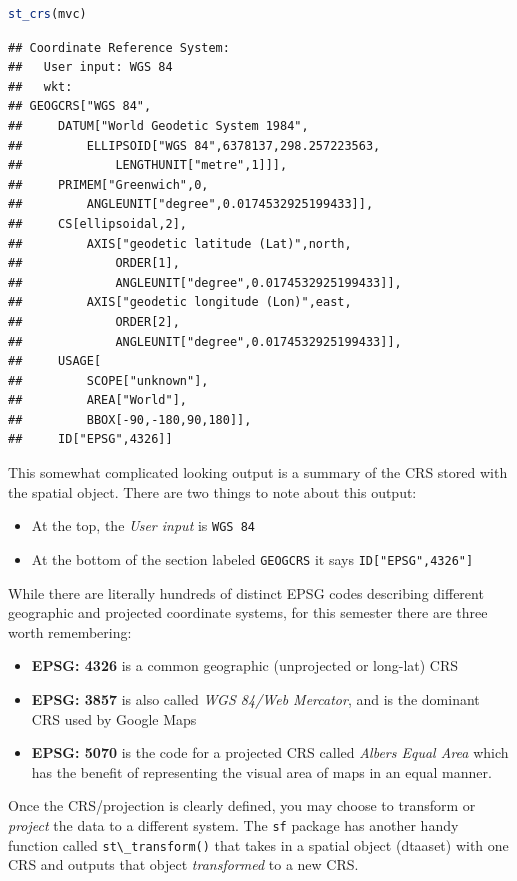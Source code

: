 \documentclass[
]{book}
\newcommand{\passthrough}[1]{#1}
\providecommand{\tightlist}{%
  \setlength{\itemsep}{0pt}\setlength{\parskip}{0pt}}
\begin{document}
\begin{lstlisting}[language=R]
st_crs(mvc)
\end{lstlisting}

\begin{lstlisting}
## Coordinate Reference System:
##   User input: WGS 84 
##   wkt:
## GEOGCRS["WGS 84",
##     DATUM["World Geodetic System 1984",
##         ELLIPSOID["WGS 84",6378137,298.257223563,
##             LENGTHUNIT["metre",1]]],
##     PRIMEM["Greenwich",0,
##         ANGLEUNIT["degree",0.0174532925199433]],
##     CS[ellipsoidal,2],
##         AXIS["geodetic latitude (Lat)",north,
##             ORDER[1],
##             ANGLEUNIT["degree",0.0174532925199433]],
##         AXIS["geodetic longitude (Lon)",east,
##             ORDER[2],
##             ANGLEUNIT["degree",0.0174532925199433]],
##     USAGE[
##         SCOPE["unknown"],
##         AREA["World"],
##         BBOX[-90,-180,90,180]],
##     ID["EPSG",4326]]
\end{lstlisting}

This somewhat complicated looking output is a summary of the CRS stored with the spatial object. There are two things to note about this output:

\begin{itemize}
\tightlist
\item
  At the top, the \emph{User input} is \passthrough{\lstinline!WGS 84!}
\item
  At the bottom of the section labeled \passthrough{\lstinline!GEOGCRS!} it says \passthrough{\lstinline!ID["EPSG",4326"]!}
\end{itemize}

While there are literally hundreds of distinct EPSG codes describing different geographic and projected coordinate systems, for this semester there are three worth remembering:

\begin{itemize}
\tightlist
\item
  \textbf{EPSG: 4326} is a common geographic (unprojected or long-lat) CRS
\item
  \textbf{EPSG: 3857} is also called \emph{WGS 84/Web Mercator}, and is the dominant CRS used by Google Maps
\item
  \textbf{EPSG: 5070} is the code for a projected CRS called \emph{Albers Equal Area} which has the benefit of representing the visual area of maps in an equal manner.
\end{itemize}

Once the CRS/projection is clearly defined, you may choose to transform or \emph{project} the data to a different system. The \passthrough{\lstinline!sf!} package has another handy function called \passthrough{\lstinline!st\_transform()!} that takes in a spatial object (dtaaset) with one CRS and outputs that object \emph{transformed} to a new CRS.
\end{document}
